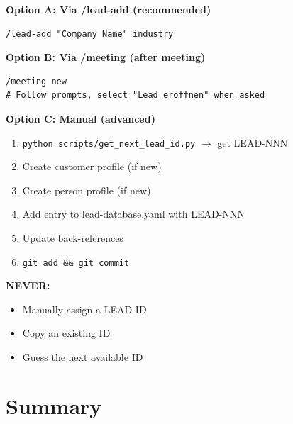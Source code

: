 \begin{tcolorbox}[colback=green!5!white, colframe=green!75!black,
    title=Quick Start: Creating a Lead]

\textbf{Option A: Via /lead-add (recommended)}
\begin{verbatim}
/lead-add "Company Name" industry
\end{verbatim}

\textbf{Option B: Via /meeting (after meeting)}
\begin{verbatim}
/meeting new
# Follow prompts, select "Lead eröffnen" when asked
\end{verbatim}

\textbf{Option C: Manual (advanced)}
\begin{enumerate}[nosep]
\item \texttt{python scripts/get\_next\_lead\_id.py} $\to$ get LEAD-NNN
\item Create customer profile (if new)
\item Create person profile (if new)
\item Add entry to lead-database.yaml with LEAD-NNN
\item Update back-references
\item \texttt{git add \&\& git commit}
\end{enumerate}

\textbf{NEVER:}
\begin{itemize}[nosep]
\item[$\times$] Manually assign a LEAD-ID
\item[$\times$] Copy an existing ID
\item[$\times$] Guess the next available ID
\end{itemize}

\end{tcolorbox}



\section{Summary}
\label{sec:bn-summary}

